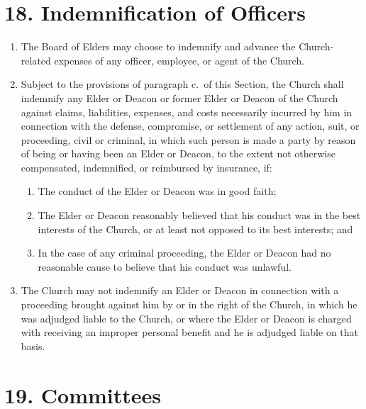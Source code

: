 \documentclass[
]{book}
\providecommand{\tightlist}{%
  \setlength{\itemsep}{0pt}\setlength{\parskip}{0pt}}
\begin{document}
\hypertarget{indemnification-of-officers}{%
\section*{18. Indemnification of Officers}\label{indemnification-of-officers}}

\begin{enumerate}
\def\labelenumi{\alph{enumi}.}
\item
  The Board of Elders may choose to indemnify and advance the Church-related expenses of any officer, employee, or agent of the Church.
\item
  Subject to the provisions of paragraph c.~of this Section, the Church shall indemnify any Elder or Deacon or former Elder or Deacon of the Church against claims, liabilities, expenses, and costs necessarily incurred by him in connection with the defense, compromise, or settlement of any action, suit, or proceeding, civil or criminal, in which such person is made a party by reason of being or having been an Elder or Deacon, to the extent not otherwise compensated, indemnified, or reimbursed by insurance, if:

  \begin{enumerate}
  \def\labelenumii{\arabic{enumii}.}
  \tightlist
  \item
    The conduct of the Elder or Deacon was in good faith;
  \item
    The Elder or Deacon reasonably believed that his conduct was in the best interests of the Church, or at least not opposed to its best interests; and
  \item
    In the case of any criminal proceeding, the Elder or Deacon had no reasonable cause to believe that his conduct was unlawful.
  \end{enumerate}
\item
  The Church may not indemnify an Elder or Deacon in connection with a proceeding brought against him by or in the right of the Church, in which he was adjudged liable to the Church, or where the Elder or Deacon is charged with receiving an improper personal benefit and he is adjudged liable on that basis.
\end{enumerate}

\hypertarget{committees}{%
\section*{19. Committees}\label{committees}}
\end{document}
